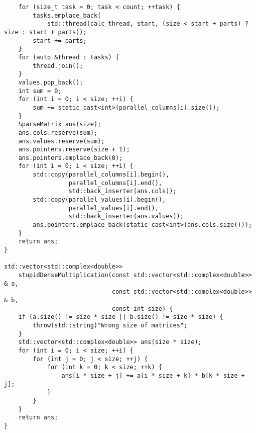 \documentclass{report}
\begin{document}
\begin{lstlisting}
    for (size_t task = 0; task < count; ++task) {
        tasks.emplace_back(
            std::thread(calc_thread, start, (size < start + parts) ? size : start + parts));
        start += parts;
    }
    for (auto &thread : tasks) {
        thread.join();
    }
    values.pop_back();
    int sum = 0;
    for (int i = 0; i < size; ++i) {
        sum += static_cast<int>(parallel_columns[i].size());
    }
    SparseMatrix ans(size);
    ans.cols.reserve(sum);
    ans.values.reserve(sum);
    ans.pointers.reserve(size + 1);
    ans.pointers.emplace_back(0);
    for (int i = 0; i < size; ++i) {
        std::copy(parallel_columns[i].begin(),
                  parallel_columns[i].end(),
                  std::back_inserter(ans.cols));
        std::copy(parallel_values[i].begin(),
                  parallel_values[i].end(),
                  std::back_inserter(ans.values));
        ans.pointers.emplace_back(static_cast<int>(ans.cols.size()));
    }
    return ans;
}

std::vector<std::complex<double>>
    stupidDenseMultiplication(const std::vector<std::complex<double>> & a,
                              const std::vector<std::complex<double>> & b,
                              const int size) {
    if (a.size() != size * size || b.size() != size * size) {
        throw(std::string)"Wrong size of matrices";
    }
    std::vector<std::complex<double>> ans(size * size);
    for (int i = 0; i < size; ++i) {
        for (int j = 0; j < size; ++j) {
            for (int k = 0; k < size; ++k) {
                ans[i * size + j] += a[i * size + k] * b[k * size + j];
            }
        }
    }
    return ans;
}
\end{lstlisting}
\end{document}
